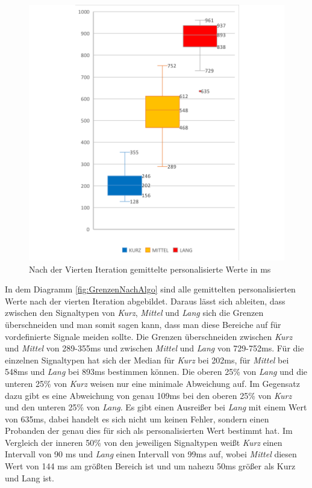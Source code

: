 \begin{figure}[htbp] 
            \centering
   	\includegraphics[width=\textwidth]{pics/analyse/algo/MinMax/GrenzenNachAlgo.png}
	\caption{Nach der Vierten Iteration gemittelte personalisierte Werte in ms}
	\label{fig:GrenzenNachAlgo}
\end{figure}

In dem Diagramm \autoref{fig:GrenzenNachAlgo} sind alle gemittelten personalisierten Werte nach der vierten Iteration abgebildet. 
Daraus l{\"a}sst sich ableiten, dass zwischen den Signaltypen von \textit{Kurz}, \textit{Mittel} und \textit{Lang} sich die Grenzen {\"u}berschneiden und man somit sagen kann, dass man diese Bereiche auf für vordefinierte Signale meiden sollte. 
Die Grenzen {\"u}berschneiden zwischen \textit{Kurz} und \textit{Mittel} von 289-355ms und zwischen \textit{Mittel} und \textit{Lang} von 729-752ms.
F{\"u}r die einzelnen Signaltypen hat sich der Median f{\"u}r \textit{Kurz} bei 202ms, f{\"u}r \textit{Mittel} bei 548ms und \textit{Lang} bei 893ms bestimmen können.
Die oberen 25\% von \textit{Lang} und die unteren 25\% von \textit{Kurz} weisen nur eine minimale Abweichung auf. 
Im Gegensatz dazu gibt es eine Abweichung von genau 109ms bei den oberen 25\% von \textit{Kurz} und den unteren 25\% von \textit{Lang}.
Es gibt einen Ausrei{\ss}er bei \textit{Lang} mit einem Wert von 635ms, dabei handelt es sich nicht um keinen Fehler, sondern einen Probanden der genau dies f{\"u}r sich als personalisierten Wert bestimmt hat.
Im Vergleich der inneren 50\% von den jeweiligen Signaltypen wei{\ss}t \textit{Kurz} einen Intervall von 90 ms und \textit{Lang} einen Intervall von 99ms auf, wobei \textit{Mittel} diesen Wert von 144 ms am gr{\"o}{\ss}ten Bereich ist und um nahezu 50ms gr{\"o}{\ss}er als Kurz und Lang ist. 


